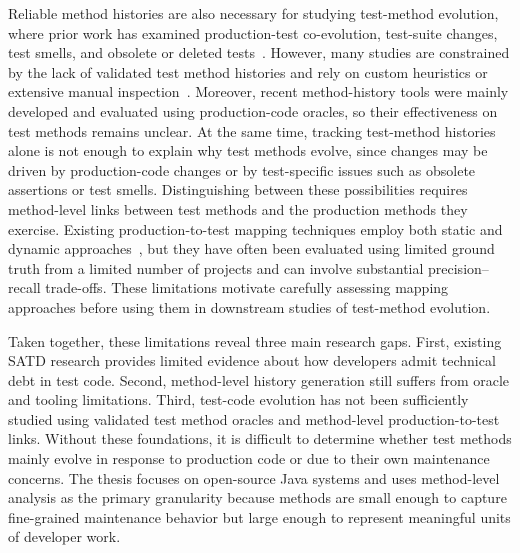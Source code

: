 Reliable method histories are also necessary for studying test-method evolution, where prior work has examined production-test co-evolution, test-suite changes, test smells, and obsolete or deleted tests~\cite{zaidman2011studying, wang2021understanding, sun_revisiting_2023, pinto2012understanding, Spadini:2018, hao2013bug, bhatta2025understanding, yaraghi2025automated}. However, many studies are constrained by the lack of validated test method histories and rely on custom heuristics or extensive manual inspection~\cite{pinto2012understanding, bhatta2025understanding, Spadini:2018}. Moreover, recent method-history tools were mainly developed and evaluated using production-code oracles, so their effectiveness on test methods remains unclear. At the same time, tracking test-method histories alone is not enough to explain why test methods evolve, since changes may be driven by production-code changes or by test-specific issues such as obsolete assertions or test smells. Distinguishing between these possibilities requires method-level links between test methods and the production methods they exercise. Existing production-to-test mapping techniques employ both static and dynamic approaches~\cite{van_rompaey_establishing_2009, white_establishing_2020, white_tctracer_2022, sun_method-level_2024}, but they have often been evaluated using limited ground truth from a limited number of projects and can involve substantial precision--recall trade-offs. These limitations motivate carefully assessing mapping approaches before using them in downstream studies of test-method evolution.




Taken together, these limitations reveal three main research gaps. First, existing SATD research provides limited evidence about how developers admit technical debt in test code. Second, method-level history generation still suffers from oracle and tooling limitations. Third, test-code evolution has not been sufficiently studied using validated test method oracles and method-level production-to-test links. Without these foundations, it is difficult to determine whether test methods mainly evolve in response to production code or due to their own maintenance concerns. The thesis focuses on open-source Java systems and uses method-level analysis as the primary granularity because methods are small enough to capture fine-grained maintenance behavior but large enough to represent meaningful units of developer work.


